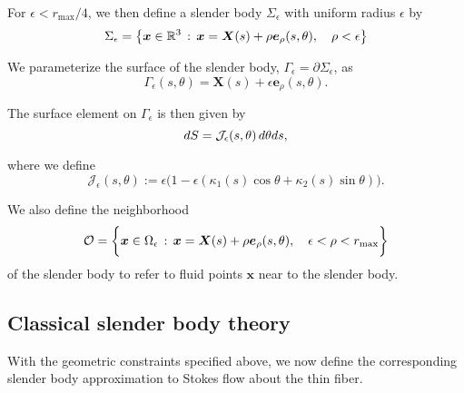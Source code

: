 \documentclass[11pt]{article}
\numberwithin{equation}{section}
\newcommand{\R}{\mathbb{R}}
\newcommand{\bx}{\bm{x}}
\newcommand{\X}{\bm{X}}
\newcommand{\be}{\bm{e}}
\newcommand{\p}{\partial}
\newcommand{\ts}{\thinspace}
\theoremstyle{definition}
\begin{document}
For $\epsilon < r_{\max}/4$, we then define a slender body $\Sigma_\epsilon$ with uniform radius $\epsilon$ by
\begin{equation}\label{slender_body}
\Sigma_{\epsilon} = \big\{\bx \in \R^3 \ts : \ts \bx= \X(s) + \rho \be_{\rho}(s,\theta), \quad \rho < \epsilon \big\}
\end{equation}
 
 We parameterize the surface of the slender body, $\Gamma_{\epsilon}=\p \Sigma_{\epsilon}$, as 
\begin{equation}\label{gamma_epsilon}
 \Gamma_{\epsilon}(s,\theta)= \X(s) + \epsilon\be_{\rho}(s,\theta). 
 \end{equation}

The surface element on $\Gamma_{\epsilon}$ is then given by
\begin{equation}\label{surface_element}
dS = \mathcal{J}_{\epsilon}(s,\theta) \ts d\theta ds, 
 \end{equation}

where we define
\begin{equation}\label{Jeps_def}
\mathcal{J}_{\epsilon}(s,\theta) := \epsilon\big(1-\epsilon(\kappa_1(s)\cos\theta+\kappa_2(s)\sin\theta) \big).
\end{equation}

We also define the neighborhood
\begin{equation}\label{region_O}
\mathcal{O} = \bigg\{\bx \in \Omega_{\epsilon} \ts : \ts \bx= \X(s) + \rho \be_{\rho}(s,\theta), \quad \epsilon < \rho<r_{\max} \bigg\}
\end{equation}
of the slender body to refer to fluid points $\bx$ near to the slender body. 



\subsection{Classical slender body theory}\label{SBT_def}
With the geometric constraints specified above, we now define the corresponding slender body approximation to Stokes flow about the thin fiber. \\
 
\end{document}
